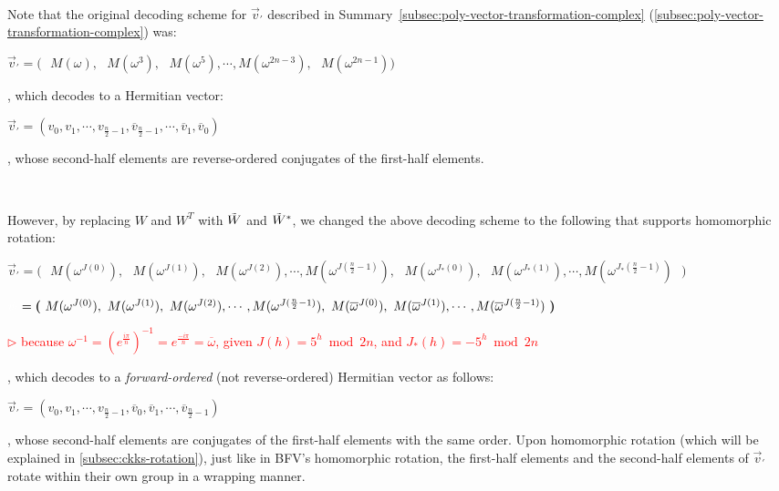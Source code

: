 $ $


 Note that the original decoding scheme for $\vec{v}_{'}$ described in Summary~\ref*{subsec:poly-vector-transformation-complex} (\autoref{subsec:poly-vector-transformation-complex}) was:

$\vec{v}_{'} = \bm{(} \text{ } M(\omega), \text{ } M(\omega^3), \text{ } M(\omega^5), \cdots, M(\omega^{2n-3}), \text{ } M(\omega^{2n-1}) \bm{)}$

, which decodes to a Hermitian vector:

$\vec{v}_{'} = (v_0, v_1, \cdots, v_{\frac{n}{2} - 1}, \overline v_{\frac{n}{2} - 1}, \cdots, \overline v_1, \overline v_0 )$

, whose second-half elements are reverse-ordered conjugates of the first-half elements.

$ $

However, by replacing $W$ and $W^T$ with $\tilde W$ and $\tilde W^*$, we changed the above decoding scheme to the following that supports homomorphic rotation:


{\small $\vec{v}_{'} =  \bm{(} \text{ }
M(\omega^{J(0)}), \text{ } M(\omega^{J(1)}), \text{ } M(\omega^{J(2)}), \cdots,  M(\omega^{J(\frac{n}{2}-1)}), \text{ } M(\omega^{J_*(0)}), \text{ } M(\omega^{J_*(1)}), \cdots,  M(\omega^{J_*(\frac{n}{2}-1)}) \text{ } \bm{)}$}

$\textcolor{white}{\vec{v}_{'}} =  \bm{(} \text{ }
M(\omega^{J(0)}), \text{ } M(\omega^{J(1)}), \text{ } M(\omega^{J(2)}), \cdots,  M(\omega^{J(\frac{n}{2}-1)}), \text{ } M(\overline\omega^{J(0)}), \text{ } M(\overline\omega^{J(1)}), \cdots,  M(\overline\omega^{J(\frac{n}{2}-1)}) \text{ } \bm{)}$

\textcolor{red}{ $\rhd$ because $\omega^{-1} = (e^{\frac{i\pi}{n}})^{-1} = e^{\frac{-i\pi}{n}} = \overline\omega$, given  $J(h) = 5^h \bmod 2n$, and $J_*(h) = -5^h \bmod 2n$}

, which decodes to a \textit{forward-ordered} (not reverse-ordered) Hermitian vector as follows:

$\vec{v}_{'} = (v_0, v_1, \cdots, v_{\frac{n}{2} - 1}, \overline v_0, \overline v_1, \cdots, \overline v_{\frac{n}{2} - 1})$

, whose second-half elements are conjugates of the first-half elements with the same order. Upon homomorphic rotation (which will be explained in \autoref{subsec:ckks-rotation}), just like in BFV's homomorphic rotation, the first-half elements and the second-half elements of $\vec{v}_{'}$ rotate within their own group in a wrapping manner.



